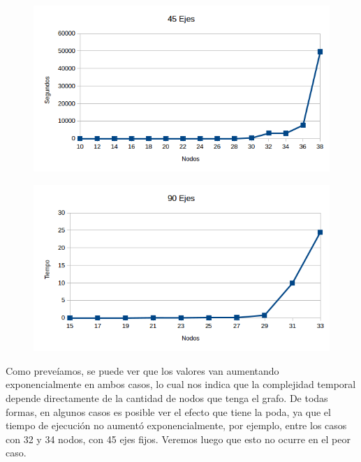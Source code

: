  \begin{figure}[h!]
   \begin{center}
 	\includegraphics[scale=0.7]{imagenes/exacto/45Ejes.png}
   \end{center}
 \end{figure}
 
 \begin{figure}[h!]
   \begin{center}
 	\includegraphics[scale=0.7]{imagenes/exacto/90Ejes.png}
   \end{center}
 \end{figure}
 
Como preve\'iamos, se puede ver que los valores van aumentando exponencialmente en ambos casos, lo cual nos indica que la complejidad temporal depende directamente de la cantidad de nodos que tenga
el grafo.
De todas formas, en algunos casos es posible ver el efecto que tiene la poda, ya que el tiempo de ejecuci\'on no aument\'o exponencialmente, por ejemplo, entre los casos con 32 y 34 nodos, con 45 ejes fijos.
Veremos luego que esto no ocurre en el peor caso.\\


